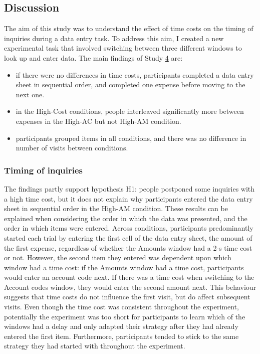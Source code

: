 \subsection{Discussion}
The aim of this study was to understand the effect of time costs on the timing of inquiries during a data entry task. To address this aim, I created a new experimental task that involved switching between three different windows to look up and enter data. The main findings of Study \hyperref[st:Study4]{4} are:

\begin{itemize}
\item
if there were no differences in time costs, participants completed a data entry sheet in sequential order, and completed one expense before moving to the next one. 
\item
in the High-Cost conditions, people interleaved significantly more between expenses in the High-AC but not High-AM condition. 
\item
participants grouped items in all conditions, and there was no difference in number of visits between conditions.
\end{itemize}

\subsubsection{Timing of inquiries}
The findings partly support hypothesis H1: people postponed some inquiries with a high time cost, but it does not explain why participants entered the data entry sheet in sequential order in the High-AM condition. 
These results can be explained when considering the order in which the data was presented, and the order in which items were entered. Across conditions, participants predominantly started each trial by entering the first cell of the data entry sheet, the amount of the first expense, regardless of whether the Amounts window had a 2-s time cost or not. However, the second item they entered was dependent upon which window had a time cost: if the Amounts window had a time cost, participants would enter an account code next. If there was a time cost when switching to the Account codes window, they would enter the second amount next.
This behaviour suggests that time costs do not influence the first visit, but do affect subsequent visits. Even though the time cost was consistent throughout the experiment, potentially the experiment was too short for participants to learn which of the windows had a delay and only adapted their strategy after they had already entered the first item. Furthermore, participants tended to stick to the same strategy they had started with throughout the experiment.

